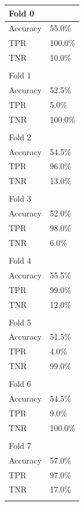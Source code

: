 \documentclass[template.tex]{subfiles}
\begin{document}
\begin{table}[H]
	\centering
    \begin{tabular}{ll}
    Fold 0 \\ \hline
    Accuracy &  55.0\% \\
	TPR &  100.0\% \\
	TNR &  10.0\% \\ \\
	
	Fold 1 \\ \hline
    Accuracy &  52.5\% \\
	TPR &  5.0\% \\
	TNR &  100.0\% \\ \\
	
	Fold 2 \\ \hline
    Accuracy &  54.5\% \\
	TPR &  96.0\% \\
	TNR &  13.0\% \\ \\
	
	Fold 3 \\ \hline
    Accuracy &  52.0\% \\
	TPR &  98.0\% \\
	TNR &  6.0\% \\ \\
	
	Fold 4 \\ \hline
    Accuracy &  55.5\% \\
	TPR &  99.0\% \\
	TNR &  12.0\% \\ \\
	
	Fold 5 \\ \hline
    Accuracy &  51.5\% \\
	TPR &  4.0\% \\
	TNR &  99.0\% \\ \\
	
	Fold 6 \\ \hline
    Accuracy &  54.5\% \\
	TPR &  9.0\% \\
	TNR &  100.0\% \\ \\
	
	Fold 7 \\ \hline
    Accuracy &  57.0\% \\
	TPR &  97.0\% \\
	TNR &  17.0\% \\ \\
	

\end{tabular}
\end{table}
\end{document}
